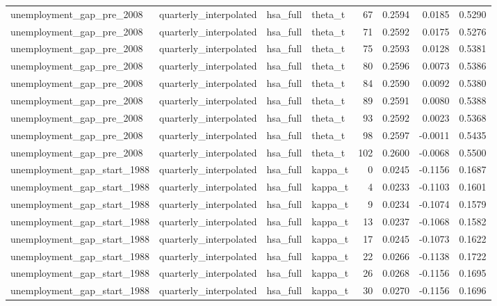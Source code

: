 \begin{tabular}{llllrrrr}
unemployment\_gap\_pre\_2008 & quarterly\_interpolated & hsa\_full & theta\_t & 67 & 0.2594 & 0.0185 & 0.5290 \\
unemployment\_gap\_pre\_2008 & quarterly\_interpolated & hsa\_full & theta\_t & 71 & 0.2592 & 0.0175 & 0.5276 \\
unemployment\_gap\_pre\_2008 & quarterly\_interpolated & hsa\_full & theta\_t & 75 & 0.2593 & 0.0128 & 0.5381 \\
unemployment\_gap\_pre\_2008 & quarterly\_interpolated & hsa\_full & theta\_t & 80 & 0.2596 & 0.0073 & 0.5386 \\
unemployment\_gap\_pre\_2008 & quarterly\_interpolated & hsa\_full & theta\_t & 84 & 0.2590 & 0.0092 & 0.5380 \\
unemployment\_gap\_pre\_2008 & quarterly\_interpolated & hsa\_full & theta\_t & 89 & 0.2591 & 0.0080 & 0.5388 \\
unemployment\_gap\_pre\_2008 & quarterly\_interpolated & hsa\_full & theta\_t & 93 & 0.2592 & 0.0023 & 0.5368 \\
unemployment\_gap\_pre\_2008 & quarterly\_interpolated & hsa\_full & theta\_t & 98 & 0.2597 & -0.0011 & 0.5435 \\
unemployment\_gap\_pre\_2008 & quarterly\_interpolated & hsa\_full & theta\_t & 102 & 0.2600 & -0.0068 & 0.5500 \\
unemployment\_gap\_start\_1988 & quarterly\_interpolated & hsa\_full & kappa\_t & 0 & 0.0245 & -0.1156 & 0.1687 \\
unemployment\_gap\_start\_1988 & quarterly\_interpolated & hsa\_full & kappa\_t & 4 & 0.0233 & -0.1103 & 0.1601 \\
unemployment\_gap\_start\_1988 & quarterly\_interpolated & hsa\_full & kappa\_t & 9 & 0.0234 & -0.1074 & 0.1579 \\
unemployment\_gap\_start\_1988 & quarterly\_interpolated & hsa\_full & kappa\_t & 13 & 0.0237 & -0.1068 & 0.1582 \\
unemployment\_gap\_start\_1988 & quarterly\_interpolated & hsa\_full & kappa\_t & 17 & 0.0245 & -0.1073 & 0.1622 \\
unemployment\_gap\_start\_1988 & quarterly\_interpolated & hsa\_full & kappa\_t & 22 & 0.0266 & -0.1138 & 0.1722 \\
unemployment\_gap\_start\_1988 & quarterly\_interpolated & hsa\_full & kappa\_t & 26 & 0.0268 & -0.1156 & 0.1695 \\
unemployment\_gap\_start\_1988 & quarterly\_interpolated & hsa\_full & kappa\_t & 30 & 0.0270 & -0.1156 & 0.1696 \\

\end{tabular}
